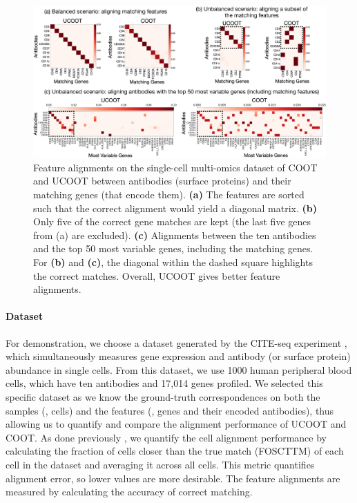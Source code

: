 \begin{figure}[t]
    \centering
    \includegraphics[trim={0.2cm 0.2cm 0.8cm 0.5cm}, clip, width=\linewidth, keepaspectratio=true]{./Chapitre3/fig/genes-alignments.pdf}
    \caption{Feature alignments on the single-cell multi-omics dataset of COOT and UCOOT between antibodies (surface proteins) and their matching genes (that encode them). \textbf{(a)} The features are sorted such that the correct alignment would yield a diagonal matrix. \textbf{(b)} Only five of the correct gene matches are kept (the last five genes from (a) are excluded). \textbf{(c)} Alignments between the ten antibodies and the top 50 most variable genes, including the matching genes.
    For \textbf{(b)} and \textbf{(c)}, the diagonal within the dashed square highlights the correct matches.
    Overall, UCOOT gives better feature alignments.
    \label{fig:multiomics}}
\end{figure}

\paragraph{Dataset} For demonstration, we choose a dataset generated by
the CITE-seq experiment \citep{CITEseq},
which simultaneously measures gene expression and antibody (or surface protein)
abundance in single cells. From this dataset, we use 1000 human peripheral blood cells,
which have ten antibodies and 17,014 genes profiled. We selected this specific dataset
as we know the ground-truth correspondences on both the samples (\ie, cells)
and the features (\ie, genes and their encoded antibodies), thus allowing us to quantify
and compare the alignment performance of UCOOT and COOT.
As done previously \citep{Pamona, Demetci22, Liu2019}, we quantify the cell alignment performance
by calculating the fraction of cells closer than the true match (FOSCTTM) of each cell
in the dataset and averaging it across all cells. This metric quantifies alignment error,
so lower values are more desirable. The feature alignments are measured by calculating
the accuracy of correct matching.

